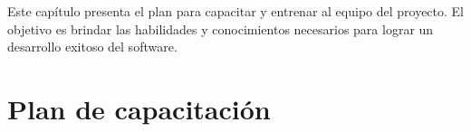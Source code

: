 Este capítulo presenta el plan para capacitar y entrenar al equipo del proyecto. El objetivo es brindar las habilidades y conocimientos necesarios para lograr un desarrollo exitoso del software.
\section{Plan de capacitación}
